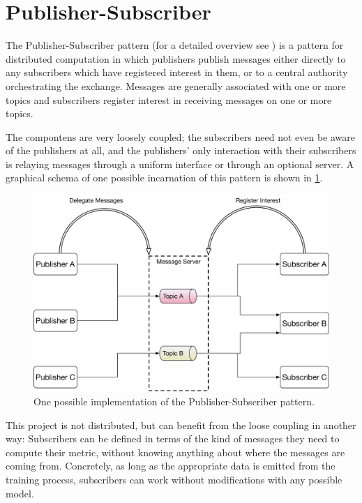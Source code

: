 \hypertarget{sec:pubsub}{%
\section{Publisher-Subscriber}\label{sec:pubsub}}

The Publisher-Subscriber pattern (for a detailed overview see
\cite{eugster2003}) is a pattern for distributed computation in which publishers
publish messages either directly to any subscribers which have registered
interest in them, or to a central authority orchestrating the exchange. Messages
are generally associated with one or more topics and subscribers register
interest in receiving messages on one or more topics.

The compontens are very loosely coupled; the subscribers need not even
be aware of the publishers at all, and the publishers' only interaction
with their subscribers is relaying messages through a uniform interface
or through an optional server. A graphical schema of one possible
incarnation of this pattern is shown in \cref{fig:pubsub}.

\begin{figure}
    \hypertarget{fig:pubsub}{%
        \centering
        \includegraphics[max width=\textwidth]{gfx/diagrams/architecture_diagrams/pubsub.pdf}
        \caption{One possible implementation of the Publisher-Subscriber pattern.}\label{fig:pubsub}
    }
\end{figure}

This project is not distributed, but can benefit from the loose coupling
in another way: Subscribers can be defined in terms of the kind of
messages they need to compute their metric, without knowing anything
about where the messages are coming from. Concretely, as long as the
appropriate data is emitted from the training process, subscribers can
work without modifications with any possible model.

